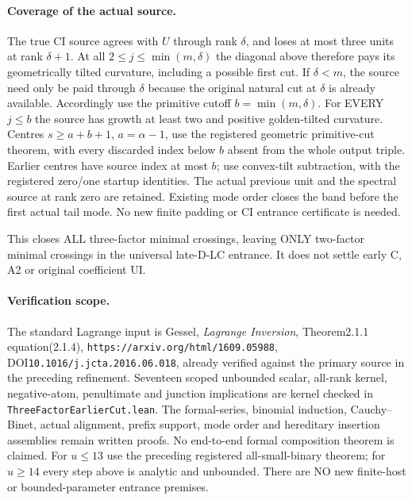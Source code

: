\paragraph{Coverage of the actual source.}
The true CI source agrees with $U$ through rank $\delta$, and loses
at most three units at rank $\delta+1$.
At all $2\le j\le\min(m,\delta)$ the diagonal above therefore
pays its geometrically tilted curvature, including a possible first cut.
If $\delta<m$, the source need only be paid through $\delta$ because
the original natural cut at $\delta$ is already available.
Accordingly use the primitive cutoff $b=\min(m,\delta)$.
For EVERY $j\le b$ the source has growth at least two and positive
golden-tilted curvature. Centres $s\ge a+b+1$, $a=\alpha-1$,
use the registered geometric primitive-cut theorem, with every
discarded index below $b$ absent from the whole output triple.
Earlier centres have source index at most $b$; use convex-tilt
subtraction, with the registered zero/one startup identities.
The actual previous unit and the spectral source at rank zero are
retained. Existing mode order closes the band before the first actual
tail mode. No new finite padding or CI entrance certificate is needed.

This closes ALL three-factor minimal crossings,
leaving ONLY two-factor minimal crossings in the universal late-D-LC
entrance. It does not settle early C, A2 or original coefficient UI.

\paragraph{Verification scope.}
The standard Lagrange input is Gessel, \emph{Lagrange Inversion},
Theorem2.1.1 equation(2.1.4),
\texttt{https://arxiv.org/html/1609.05988},
DOI\texttt{10.1016/j.jcta.2016.06.018}, already verified against the
primary source in the preceding refinement. Seventeen scoped unbounded
scalar, all-rank kernel, negative-atom, penultimate and junction
implications are kernel checked in \texttt{ThreeFactorEarlierCut.lean}.
The formal-series, binomial induction, Cauchy--Binet, actual alignment,
prefix support, mode order and hereditary insertion assemblies remain
written proofs. No end-to-end formal composition theorem is claimed.
For $u\le13$ use the preceding registered all-small-binary theorem;
for $u\ge14$ every step above is analytic and unbounded. There are
NO new finite-host or bounded-parameter entrance premises.
